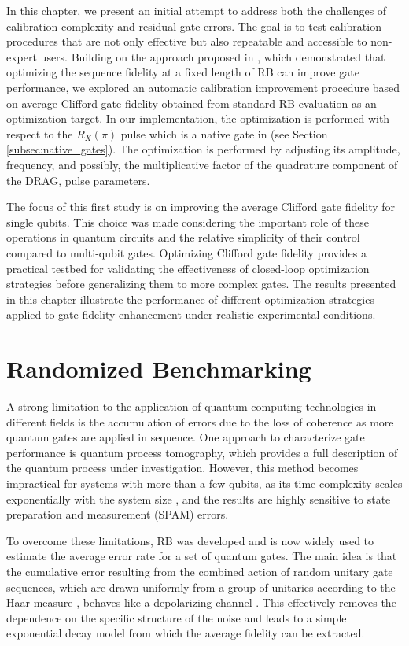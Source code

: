 In this chapter, we present an initial attempt to address both the challenges of calibration complexity and residual gate errors. 
The goal is to test calibration procedures that are not only effective but also repeatable and accessible to non-expert users.  
Building on the approach proposed in \cite{kelly_optimal_2014}, which demonstrated that optimizing the sequence fidelity at a fixed length of RB can improve gate performance, we explored an automatic calibration improvement procedure based on average Clifford gate fidelity obtained from standard RB evaluation as an optimization target.
In our implementation, the optimization is performed with respect to the $R_X(\pi)$ pulse which is a native gate in \Qibolab (see Section \ref{subsec:native_gates}).
The optimization is performed by adjusting its amplitude, frequency, and possibly, the multiplicative factor of the quadrature component of the DRAG, pulse parameters.

The focus of this first study is on improving the average Clifford gate fidelity for single qubits. 
This choice was made considering the important role of these operations in quantum circuits and the relative simplicity of their control compared to multi-qubit gates.
Optimizing Clifford gate fidelity provides a practical testbed for validating the effectiveness of closed-loop optimization strategies before generalizing them to more complex gates.
The results presented in this chapter illustrate the performance of different optimization strategies applied to gate fidelity enhancement under realistic experimental conditions.

\section{Randomized Benchmarking}\label{sec:RBsection}
A strong limitation to the application of quantum computing technologies in different fields is the accumulation of errors due to the loss of coherence as more quantum gates are applied in sequence. 
One approach to characterize gate performance is quantum process tomography, which provides a full description of the quantum process under investigation. 
However, this method becomes impractical for systems with more than a few qubits, as its time complexity scales exponentially with the system size \cite{QPTomography}, and the results are highly sensitive to state preparation and measurement (SPAM) errors.

To overcome these limitations, RB was developed and is now widely used to estimate the average error rate for a set of quantum gates. 
The main idea is that the cumulative error resulting from the combined action of random unitary gate sequences, which are drawn uniformly from a group of unitaries according to the Haar measure \cite{Mele_2024}, behaves like a depolarizing channel \cite{Emerson_2005_RB}. 
This effectively removes the dependence on the specific structure of the noise and leads to a simple exponential decay model from which the average fidelity can be extracted.


